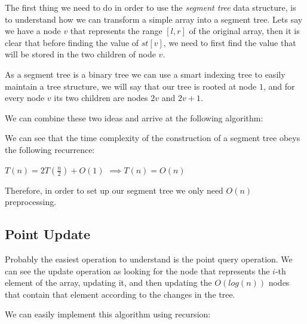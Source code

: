 \documentclass{article}
\begin{document}
The first thing we need to do in order to use the \textit{segment tree} data structure, is to understand how we can transform a simple array into a segment tree. Lets say we have a node $v$ that represents the range $[l, r]$ of the original array, then it is clear that before finding the value of $st[v]$, we need to first find the value that will be stored in the two children of node $v$. 

As a segment tree is a binary tree we can use a smart indexing tree to easily maintain a tree structure, we will say that our tree is rooted at node $1$, and for every node $v$ its two children are nodes $2v$ and $2v + 1$.

We can combine these two ideas and arrive at the following algorithm:

\begin{algorithm}
	\SetAlgoNoLine
	\SetAlgoNoEnd
\end{algorithm}

We can see that the time complexity of the construction of a segment tree obeys the following recurrence:

$T(n) = 2T\left(\frac{n}{2}\right) + O(1)$
$\implies T(n) = O(n)$

Therefore, in order to set up our segment tree we only need $O(n)$ preprocessing.

\subsection{Point Update}

Probably the easiest operation to understand is the point query operation. We can see the update operation as looking for the node that represents the $i$-th element of the array, updating it, and then updating the $O(log(n))$ nodes that contain that element according to the changes in the tree.

We can easily implement this algorithm using recursion:

\begin{algorithm}
	\SetAlgoNoLine
	\SetAlgoNoEnd
\end{algorithm}
\end{document}
